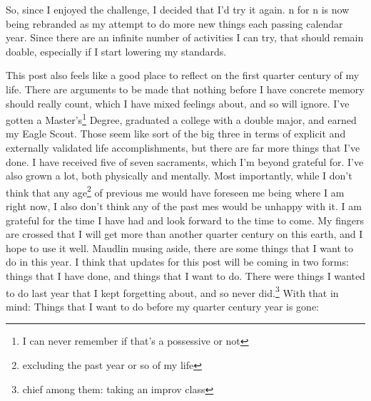 \documentclass[12pt]{article}[titlepage]
\newcommand{\1}{\={a}}
\newcommand{\2}{\={e}}
\newcommand{\3}{\={\i}}
\newcommand{\4}{\=o}
\newcommand{\5}{\=u}
\newcommand{\6}{\={A}}
\renewcommand{\,}{\textsuperscript{,}}
\begin{document}
So, since I enjoyed the challenge, I decided that I'd try it again.
n for n is now being rebranded as my attempt to do more new things each passing calendar year.
Since there are an infinite number of activities I can try, that should remain doable, especially if I start lowering my standards.

This post also feels like a good place to reflect on the first quarter century of my life.
There are arguments to be made that nothing before I have concrete memory should really count, which I have mixed feelings about, and so will ignore.
I've gotten a Master's\footnote{I can never remember if that's a possessive or not} Degree, graduated a college with a double major, and earned my Eagle Scout.
Those seem like sort of the big three in terms of explicit and externally validated life accomplishments, but there are far more things that I've done.
I have received five of seven sacraments, which I'm beyond grateful for.
I've also grown a lot, both physically and mentally.
Most importantly, while I don't think that any age\footnote{excluding the past year or so of my life} of previous me would have foreseen me being where I am right now, I also don't think any of the past mes would be unhappy with it.
I am grateful for the time I have had and look forward to the time to come.
My fingers are crossed that I will get more than another quarter century on this earth, and I hope to use it well.
Maudlin musing aside, there are some things that I want to do in this year.
I think that updates for this post will be coming in two forms: things that I have done, and things that I want to do.
There were things I wanted to do last year that I kept forgetting about, and so never did.\footnote{chief among them: taking an improv class}
With that in mind:
Things that I want to do before my quarter century year is gone:
\end{document}
